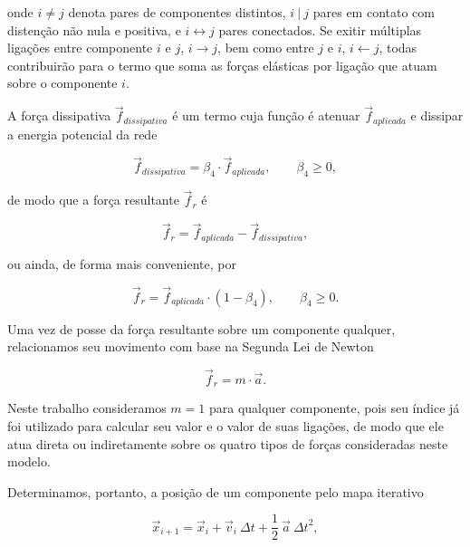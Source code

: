 \noindent
onde $i \neq j$ denota pares de componentes distintos, $i \ | \ j$
pares em contato com distenção não nula e positiva, e $i \leftrightarrow j$
pares conectados.
Se exitir múltiplas ligações entre componente $i$ e $j$, $i \rightarrow j$, bem
como entre $j$ e $i$, $i \leftarrow j$, todas contribuirão para o termo que soma
as forças elásticas por ligação que atuam sobre o componente $i$.

A força dissipativa $\vec{f}_{dissipativa}$ é um termo cuja função é atenuar
$\vec{f}_{aplicada}$ e dissipar a energia potencial da rede

\begin{equation}
	\label{Equation:FrictionForce}
	\vec{f}_{dissipativa} = \beta_4 \cdot \vec{f}_{aplicada}, \qquad \beta_4 \geq 0,
\end{equation}

\noindent
de modo que a força resultante $\vec{f}_{r}$ é

\begin{equation}
	\label{Equation:FinalForce1}
	\vec{f}_{r} = \vec{f}_{aplicada} - \vec{f}_{dissipativa},
\end{equation}

\noindent
ou ainda, de forma mais conveniente, por

\begin{equation}
	\label{Equation:FinalForce2}
	\vec{f}_{r} = \vec{f}_{aplicada} \cdot (1 - \beta_4), \qquad \beta_4 \geq 0.
\end{equation}

Uma vez de posse da força resultante sobre um componente qualquer, relacionamos
seu movimento com base na Segunda Lei de Newton

\begin{equation}
	\label{Equation:NewtonSecondLaw}
	\vec{f}_{r} = m \cdot \vec{a}.
\end{equation}

Neste trabalho consideramos $m = 1$ para qualquer componente, pois seu índice já
foi utilizado para calcular seu valor e o valor de suas ligações, de modo que
ele atua direta ou indiretamente sobre os quatro tipos de forças consideradas
neste modelo.

Determinamos, portanto, a posição de um componente pelo mapa iterativo

\begin{equation}
	\label{Equation:IterativePosition}
	\vec{x}_{i+1} = \vec{x}_i + \vec{v}_i \  \Delta t + \frac{1}{2} \  \vec{a} \  {\Delta t}^2,
\end{equation}

